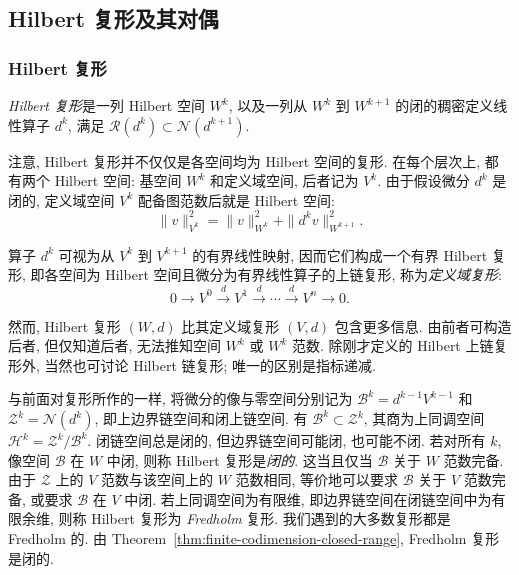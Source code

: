 \subsection{{Hilbert 复形及其对偶}}\label{sec:hilbert-complexes-duals}

\subsubsection{{Hilbert 复形}}\label{subsec:hilbert-complexes-definition}

\begin{Definition}\label{def:hilbert-complex}
{\emph{Hilbert 复形}是一列 Hilbert 空间 $W^k$, 以及一列从 $W^k$ 到 $W^{k+1}$ 的闭的稠密定义线性算子 $d^k$, 满足 $\mathcal R(d^k)\subset\mathcal N(d^{k+1})$.}
\end{Definition}

{注意, Hilbert 复形并不仅仅是各空间均为 Hilbert 空间的复形. 在每个层次上, 都有两个 Hilbert 空间: 基空间 $W^k$ 和定义域空间, 后者记为 $V^k$. 由于假设微分 $d^k$ 是闭的, 定义域空间 $V^k$ 配备图范数后就是 Hilbert 空间:}
\[
\|v\|_{V^k}^2=\|v\|_{W^k}^2+\|d^k v\|_{W^{k+1}}^2.
\]

{算子 $d^k$ 可视为从 $V^k$ 到 $V^{k+1}$ 的有界线性映射, 因而它们构成一个有界 Hilbert 复形, 即各空间为 Hilbert 空间且微分为有界线性算子的上链复形, 称为\emph{定义域复形}:}
\begin{equation}\label{eq:hilbert-domain-complex}
0\to V^0\xrightarrow{d}V^1\xrightarrow{d}\cdots\xrightarrow{d}V^n\to0.
\end{equation}

{然而, Hilbert 复形 $(W,d)$ 比其定义域复形 $(V,d)$ 包含更多信息. 由前者可构造后者, 但仅知道后者, 无法推知空间 $W^k$ 或 $W^k$ 范数. 除刚才定义的 Hilbert 上链复形外, 当然也可讨论 Hilbert 链复形; 唯一的区别是指标递减.}

{与前面对复形所作的一样, 将微分的像与零空间分别记为 $\mathcal B^k=d^{k-1}V^{k-1}$ 和 $\mathcal Z^k=\mathcal N(d^k)$, 即上边界链空间和闭上链空间. 有 $\mathcal B^k\subset\mathcal Z^k$, 其商为上同调空间 $\mathcal H^k=\mathcal Z^k/\mathcal B^k$. 闭链空间总是闭的, 但边界链空间可能闭, 也可能不闭. 若对所有 $k$, 像空间 $\mathcal B$ 在 $W$ 中闭, 则称 Hilbert 复形是\emph{闭的}. 这当且仅当 $\mathcal B$ 关于 $W$ 范数完备. 由于 $\mathcal Z$ 上的 $V$ 范数与该空间上的 $W$ 范数相同, 等价地可以要求 $\mathcal B$ 关于 $V$ 范数完备, 或要求 $\mathcal B$ 在 $V$ 中闭. 若上同调空间为有限维, 即边界链空间在闭链空间中为有限余维, 则称 Hilbert 复形为 \emph{Fredholm} 复形. 我们遇到的大多数复形都是 Fredholm 的. 由 Theorem~\ref{thm:finite-codimension-closed-range}, Fredholm 复形是闭的.}

